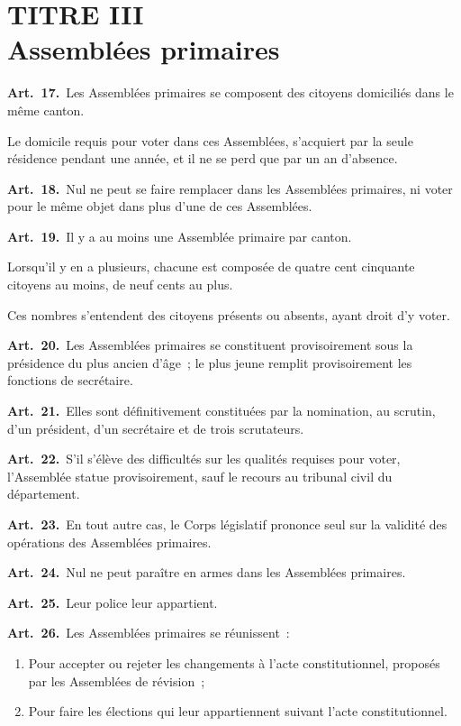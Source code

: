 \documentclass[french,twoside]{book} %
\newcommand{\labelchar}[1]{\textbf{\color{rubric} #1}}
\begin{document}
\section[{TITRE III. Assemblées primaires}]{TITRE III \\
Assemblées primaires}

\labelchar{Art. 17.} Les Assemblées primaires se composent des citoyens domiciliés dans le même canton.\par
Le domicile requis pour voter dans ces Assemblées, s’acquiert par la seule résidence pendant une année, et il ne se perd que par un an d’absence.\par
\labelchar{Art. 18.} Nul ne peut se faire remplacer dans les Assemblées primaires, ni voter pour le même objet dans plus d’une de ces Assemblées.\par
\labelchar{Art. 19.} Il y a au moins une Assemblée primaire par canton.\par
Lorsqu’il y en a plusieurs, chacune est composée de quatre cent cinquante citoyens au moins, de neuf cents au plus.\par
Ces nombres s’entendent des citoyens présents ou absents, ayant droit d’y voter.\par
\labelchar{Art. 20.} Les Assemblées primaires se constituent provisoirement sous la présidence du plus ancien d’âge ; le plus jeune remplit provisoirement les fonctions de secrétaire.\par
\labelchar{Art. 21.} Elles sont définitivement constituées par la nomination, au scrutin, d’un président, d’un secrétaire et de trois scrutateurs.\par
\labelchar{Art. 22.} S’il s’élève des difficultés sur les qualités requises pour voter, l’Assemblée statue provisoirement, sauf le recours au tribunal civil du département.\par
\labelchar{Art. 23.} En tout autre cas, le Corps législatif prononce seul sur la validité des opérations des Assemblées primaires.\par
\labelchar{Art. 24.} Nul ne peut paraître en armes dans les Assemblées primaires.\par
\labelchar{Art. 25.} Leur police leur appartient.\par
\labelchar{Art. 26.} Les Assemblées primaires se réunissent :\par

\begin{enumerate}[itemsep=0pt,topsep=0pt,partopsep=0pt,parskip=0pt]
\item Pour accepter ou rejeter les changements à l’acte constitutionnel, proposés par les Assemblées de révision ;
\item Pour faire les élections qui leur appartiennent suivant l’acte constitutionnel.
\end{enumerate}
\end{document}

